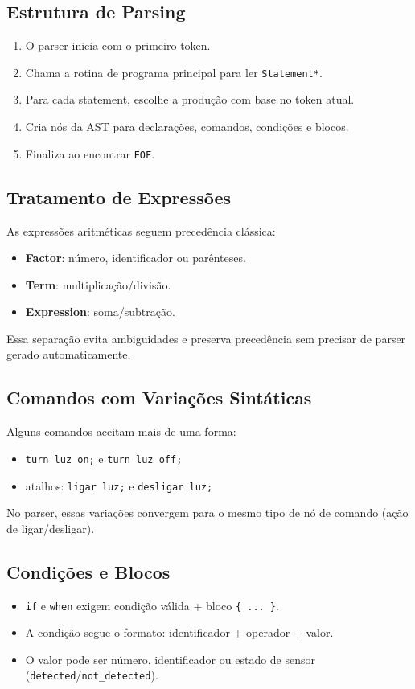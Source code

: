 \documentclass[12pt,a4paper]{article}
\begin{document}
\subsection{Estrutura de Parsing}
\begin{enumerate}[label=\arabic*.]
  \item O parser inicia com o primeiro token.
  \item Chama a rotina de programa principal para ler \texttt{Statement*}.
  \item Para cada statement, escolhe a produção com base no token atual.
  \item Cria nós da AST para declarações, comandos, condições e blocos.
  \item Finaliza ao encontrar \texttt{EOF}.
\end{enumerate}

\subsection{Tratamento de Expressões}
As expressões aritméticas seguem precedência clássica:
\begin{itemize}
  \item \textbf{Factor}: número, identificador ou parênteses.
  \item \textbf{Term}: multiplicação/divisão.
  \item \textbf{Expression}: soma/subtração.
\end{itemize}

Essa separação evita ambiguidades e preserva precedência sem precisar de parser gerado automaticamente.

\subsection{Comandos com Variações Sintáticas}
Alguns comandos aceitam mais de uma forma:
\begin{itemize}
  \item \texttt{turn luz on;} e \texttt{turn luz off;}
  \item atalhos: \texttt{ligar luz;} e \texttt{desligar luz;}
\end{itemize}

No parser, essas variações convergem para o mesmo tipo de nó de comando (ação de ligar/desligar).

\subsection{Condições e Blocos}
\begin{itemize}
  \item \texttt{if} e \texttt{when} exigem condição válida + bloco \texttt{\{ ... \}}.
  \item A condição segue o formato: identificador + operador + valor.
  \item O valor pode ser número, identificador ou estado de sensor (\texttt{detected}/\texttt{not\_detected}).
\end{itemize}
\end{document}
